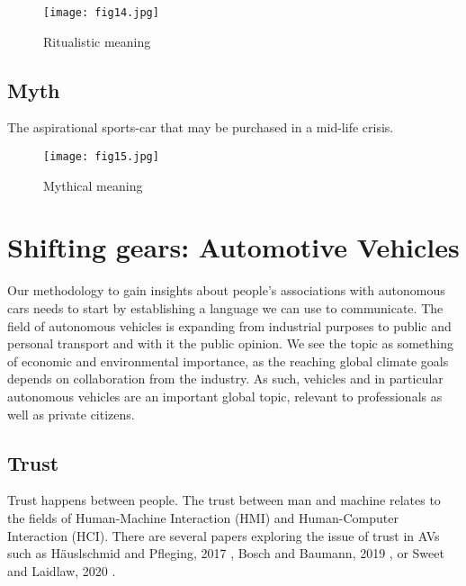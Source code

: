 \documentclass[12pt, usenames, dvipsnames]{report}
\begin{document}
\begin{flushleft}
\vspace*{1.2em}
\begin{figure}[!htbp]
  \hspace*{5em}
  \texttt{[image: fig14.jpg]}
  \caption{Ritualistic meaning}
  \label{fig:figure14}
\end{figure}
\vspace*{1.2em}

\subsection{Myth}

The aspirational sports-car that may be purchased in a mid-life crisis.

\vspace*{1.2em}
\begin{figure}[!htbp]
  \hspace*{5em}
  \texttt{[image: fig15.jpg]}
  \caption{Mythical meaning}
  \label{fig:figure15}
\end{figure}
\vspace*{1.2em}


\section{Shifting gears: Automotive Vehicles}

Our methodology to gain insights about people's associations with autonomous cars needs to start by establishing a language we can use to communicate. 
The field of autonomous vehicles is expanding from industrial purposes to public and personal transport and with it the public opinion.
We see the topic as something of economic and environmental importance, as the reaching global climate goals depends on collaboration from the industry. 
As such, vehicles and in particular autonomous vehicles are an important global topic, relevant to professionals as well as private citizens.

\subsection{Trust}
\label{sec:trust}

Trust happens between people. 
The trust between man and machine relates to the fields of Human-Machine Interaction (HMI) and Human-Computer Interaction (HCI).
There are several papers exploring the issue of trust in AVs such as Häuslschmid and Pfleging, 2017 \cite{haeuslschmid2017}, Bosch and Baumann, 2019 \cite{bosch2019}, or Sweet and Laidlaw, 2020 \cite{sweet2020}.


\end{flushleft}
\end{document}
